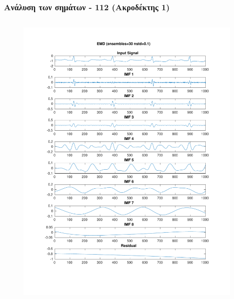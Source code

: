 \documentclass{beamer}
\begin{document}
\begin{frame}
\frametitle{Ανάλυση των σημάτων - 112 (Ακροδέκτης 1)}

\begin{columns}
\begin{figure}
\includegraphics[width=\textwidth]{fig/112l1_emd_ensemble.pdf}
\end{figure}


\end{columns}
\end{frame}
\end{document}
